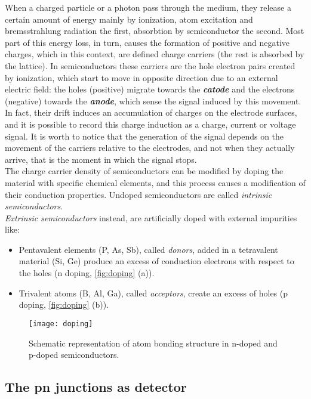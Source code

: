 When a charged particle or a photon pass through the medium, they release a certain amount of energy mainly by ionization, atom excitation and bremsstrahlung radiation the first, absorbtion by semiconductor the second. Most part of this energy loss, in turn, causes the formation of positive and negative charges, which in this context, are defined charge carriers (the rest is absorbed by the lattice). In semiconductors these carriers are the hole electron pairs created by ionization, which start to move in opposite direction due to an external electric field: the holes (positive) migrate towards the \textit{\textbf{catode}} and the electrons (negative) towards the \textit{\textbf{anode}}, which sense the signal induced by this movement. In fact, their drift induces an accumulation of charges on the electrode surfaces, and it is possible to record this charge induction as a charge, current or voltage signal. It is worth to notice that the generation of the signal depends on the movement of the carriers relative to the electrodes, and not when they actually arrive, that is the moment in which the signal stops.\\

The charge carrier density of semiconductors can be modified by doping the material with specific chemical elements, and this process causes a modification of their conduction properties.
Undoped semiconductors are called \emph{intrinsic semiconductors}. \\
\emph{Extrinsic semiconductors} instead, are artificially doped with external impurities like: 

\begin{itemize}
\item Pentavalent elements (P, As, Sb), called \emph{donors}, added in a tetravalent material (Si, Ge) produce an excess of conduction electrons with respect to the holes (n doping, \autoref{fig:doping} (a)).
\item Trivalent atoms (B, Al, Ga), called \emph{acceptors}, create an excess of holes (p doping, \autoref{fig:doping} (b)).
\end{itemize}

\begin{figure}[h!]
\centering
\texttt{[image: doping]}
\caption{Schematic representation of atom bonding structure in n-doped and p-doped semiconductors.}
\label{fig:doping}
\end{figure}


\subsection{The pn junctions as detector}

